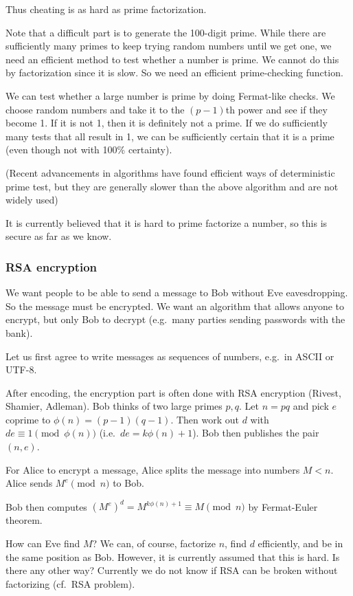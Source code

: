 \documentclass[a4paper]{article}
\begin{document}
Thus cheating is as hard as prime factorization.

Note that a difficult part is to generate the 100-digit prime. While there are sufficiently many primes to keep trying random numbers until we get one, we need an efficient method to test whether a number is prime. We cannot do this by factorization since it is slow. So we need an efficient prime-checking function.

We can test whether a large number is prime by doing Fermat-like checks. We choose random numbers and take it to the $(p - 1)$th power and see if they become 1. If it is not 1, then it is definitely not a prime. If we do sufficiently many tests that all result in 1, we can be sufficiently certain that it is a prime (even though not with 100\% certainty).

(Recent advancements in algorithms have found efficient ways of deterministic prime test, but they are generally slower than the above algorithm and are not widely used)

It is currently believed that it is hard to prime factorize a number, so this is secure as far as we know.
\subsubsection*{RSA encryption}

\begin{thm}
  We want people to be able to send a message to Bob without Eve eavesdropping. So the message must be encrypted. We want an algorithm that allows anyone to encrypt, but only Bob to decrypt (e.g.\ many parties sending passwords with the bank).

  Let us first agree to write messages as sequences of numbers, e.g.\ in ASCII or UTF-8.

  After encoding, the encryption part is often done with RSA encryption (Rivest, Shamier, Adleman). Bob thinks of two large primes $p, q$. Let $n = pq$ and pick $e$ coprime to $\phi(n) = (p - 1)(q - 1)$. Then work out $d$ with $de \equiv 1\pmod {\phi(n)}$ (i.e.\ $de = k\phi(n) + 1$). Bob then publishes the pair $(n, e)$.

  For Alice to encrypt a message, Alice splits the message into numbers $M < n$. Alice sends $M^e \pmod n$ to Bob.

  Bob then computes $(M^e)^d = M^{k\phi(n) + 1} \equiv M\pmod n$ by Fermat-Euler theorem.

  How can Eve find $M$? We can, of course, factorize $n$, find $d$ efficiently, and be in the same position as Bob. However, it is currently assumed that this is hard. Is there any other way? Currently we do not know if RSA can be broken without factorizing (cf.\ RSA problem).
\end{thm}
\end{document}
